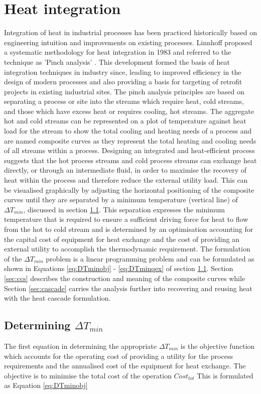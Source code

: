 
\section{Heat integration}
\label{heat_integration}
Integration of heat in industrial processes has been practiced historically based on engineering intuition and improvements on existing processes. Linnhoff proposed a systematic methodology for heat integration in 1983 and referred to the technique as 'Pinch analysis' \cite{linnhoff_1983_pinch}. This development formed the basis of heat integration techniques in industry since, leading to improved efficiency in the design of modern processes and also providing a basis for targeting of retrofit projects in existing industrial sites. The pinch analysis principles are based on separating a process or site into the streams which require heat, cold streams, and those which have excess heat or requires cooling, hot streams. The aggregate hot and cold streams can be represented on a plot of temperature against heat load for the stream to show the total cooling and heating needs of a process and are named composite curves as they represent the total heating and cooling needs of all streams within a process. Designing an integrated and heat-efficient process suggests that the hot process streams and cold process streams can exchange heat directly, or through an intermediate fluid, in order to maximise the recovery of heat within the process and therefore reduce the external utility load. This can be visualised graphically by adjusting the horizontal positioning of the composite curves until they are separated by a minimum temperature (vertical line) of $\Delta T_{min}$, discussed in section \ref{sec:DTmin}. This separation expresses the minimum temperature that is required to ensure a sufficient driving force for heat to flow from the hot to cold stream and is determined by an optimisation accounting for the capital cost of equipment for heat exchange and the cost of providing an external utility to accomplish the thermodynamic requirement. The formulation of the $\Delta T_{min}$ problem is a linear programming problem and can be formulated as shown in Equations \ref{eq:DTminobj} - \ref{eq:DTminqex} of section \ref{sec:DTmin}. Section \ref{sec:ccs} describes the construction and meaning of the composite curves while Section \ref{sec:cascade} carries the analysis further into recovering and reusing heat with the heat cascade formulation.

\subsection{Determining $\Delta T_{min}$}\label{sec:DTmin}
The first equation in determining the appropriate $\Delta T_{min}$ is the objective function which accounts for the operating cost of providing a utility for the process requirements and the annualised cost of the equipment for heat exchange. The objective is to minimise the total cost of the operation $Cost_{tot}$ This is formulated as Equation \ref{eq:DTminobj}


